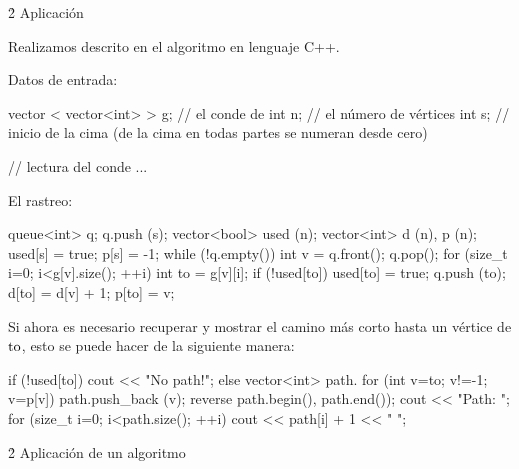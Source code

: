 \h2{ Aplicación }

Realizamos descrito en el algoritmo en lenguaje C++.

Datos de entrada:

\code

vector < vector<int> > g; // el conde de
int n; // el número de vértices
int s; // inicio de la cima (de la cima en todas partes se numeran desde cero)

// lectura del conde
...
\endcode

El rastreo:

\code

queue<int> q;
q.push (s);
vector<bool> used (n);
vector<int> d (n), p (n);
used[s] = true;
p[s] = -1;
while (!q.empty()) {
int v = q.front();
q.pop();
for (size_t i=0; i<g[v].size(); ++i) {
int to = g[v][i];
if (!used[to]) {
used[to] = true;
q.push (to);
d[to] = d[v] + 1;
p[to] = v;
}
}
}
\endcode

Si ahora es necesario recuperar y mostrar el camino más corto hasta un vértice de $\rm to$, esto se puede hacer de la siguiente manera:

\code

if (!used[to])
cout << "No path!";
else {
vector<int> path.
for (int v=to; v!=-1; v=p[v])
path.push_back (v);
reverse path.begin(), path.end());
cout << "Path: ";
for (size_t i=0; i<path.size(); ++i)
cout << path[i] + 1 << " ";
}
\endcode


\h2{ Aplicación de un algoritmo }

